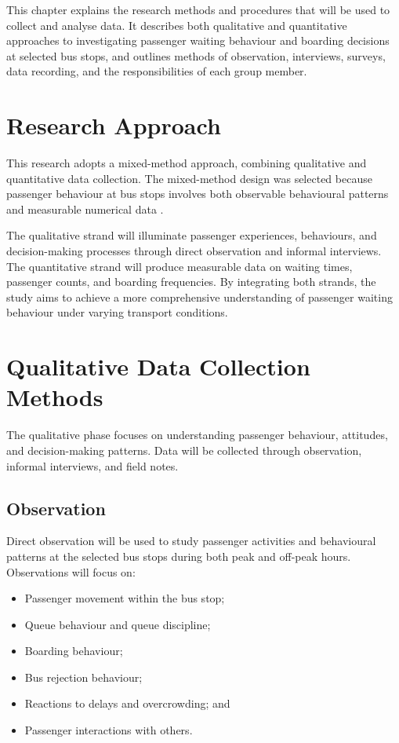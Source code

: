 \documentclass[12pt, a4paper]{report}
\begin{document}
This chapter explains the research methods and procedures that will be used to collect and
analyse data. It describes both qualitative and quantitative approaches to investigating
passenger waiting behaviour and boarding decisions at selected bus stops, and outlines
methods of observation, interviews, surveys, data recording, and the responsibilities of
each group member.

\section{Research Approach}

This research adopts a mixed-method approach, combining qualitative and quantitative data
collection. The mixed-method design was selected because passenger behaviour at bus
stops involves both observable behavioural patterns and measurable numerical data
\citep{creswell2014}.

The qualitative strand will illuminate passenger experiences, behaviours, and
decision-making processes through direct observation and informal interviews. The
quantitative strand will produce measurable data on waiting times, passenger counts, and
boarding frequencies. By integrating both strands, the study aims to achieve a more
comprehensive understanding of passenger waiting behaviour under varying transport
conditions.

\section{Qualitative Data Collection Methods}

The qualitative phase focuses on understanding passenger behaviour, attitudes, and
decision-making patterns. Data will be collected through observation, informal interviews,
and field notes.

\subsection{Observation}

Direct observation will be used to study passenger activities and behavioural patterns at the
selected bus stops during both peak and off-peak hours. Observations will focus on:

\begin{itemize}[noitemsep]
    \item Passenger movement within the bus stop;
    \item Queue behaviour and queue discipline;
    \item Boarding behaviour;
    \item Bus rejection behaviour;
    \item Reactions to delays and overcrowding; and
    \item Passenger interactions with others.
\end{itemize}
\end{document}
